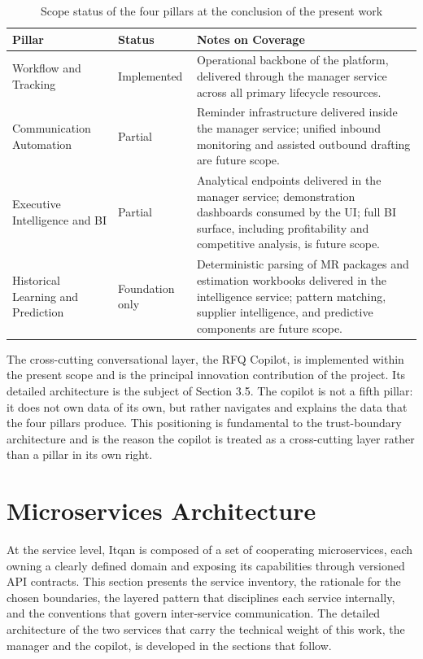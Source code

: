 \begin{table}[H]
\centering
\renewcommand{\arraystretch}{1.4}
\begin{tabular}{|p{3.6cm}|p{2cm}|p{8.4cm}|}
\hline
\rowcolor{lightgray}
\textbf{Pillar} & \textbf{Status} & \textbf{Notes on Coverage} \\ \hline
Workflow and Tracking & Implemented & Operational backbone of the platform, delivered through the manager service across all primary lifecycle resources. \\ \hline
Communication Automation & Partial & Reminder infrastructure delivered inside the manager service; unified inbound monitoring and assisted outbound drafting are future scope. \\ \hline
Executive Intelligence and BI & Partial & Analytical endpoints delivered in the manager service; demonstration dashboards consumed by the UI; full BI surface, including profitability and competitive analysis, is future scope. \\ \hline
Historical Learning and Prediction & Foundation only & Deterministic parsing of MR packages and estimation workbooks delivered in the intelligence service; pattern matching, supplier intelligence, and predictive components are future scope. \\ \hline
\end{tabular}
\caption{Scope status of the four pillars at the conclusion of the present work}
\label{tab:pillar_scope}
\end{table}

The cross-cutting conversational layer, the RFQ Copilot, is implemented within the present scope and is the principal innovation contribution of the project. Its detailed architecture is the subject of Section 3.5. The copilot is not a fifth pillar: it does not own data of its own, but rather navigates and explains the data that the four pillars produce. This positioning is fundamental to the trust-boundary architecture and is the reason the copilot is treated as a cross-cutting layer rather than a pillar in its own right.

\section{Microservices Architecture}
At the service level, Itqan is composed of a set of cooperating microservices, each owning a clearly defined domain and exposing its capabilities through versioned API contracts. This section presents the service inventory, the rationale for the chosen boundaries, the layered pattern that disciplines each service internally, and the conventions that govern inter-service communication. The detailed architecture of the two services that carry the technical weight of this work, the manager and the copilot, is developed in the sections that follow.


